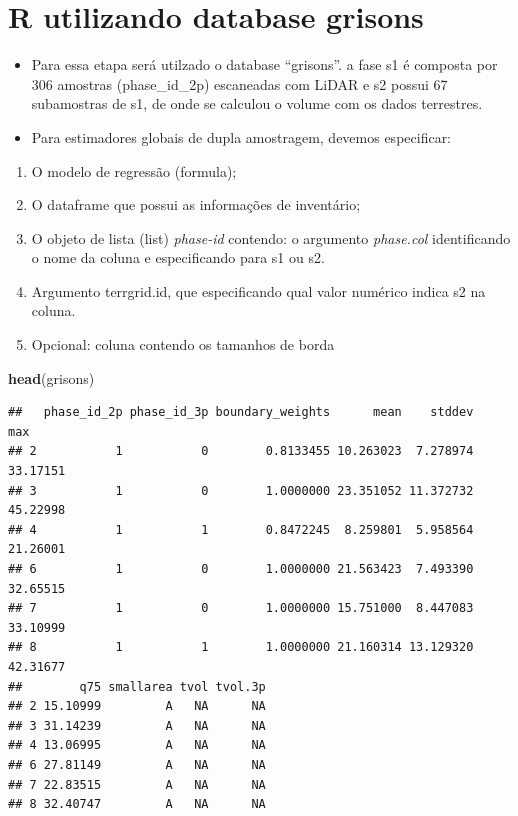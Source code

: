 \documentclass[
]{article}
\newenvironment{Shaded}{\begin{snugshade}}{\end{snugshade}}
\newcommand{\FunctionTok}[1]{\textcolor[rgb]{0.13,0.29,0.53}{\textbf{#1}}}
\newcommand{\NormalTok}[1]{#1}
\providecommand{\tightlist}{%
  \setlength{\itemsep}{0pt}\setlength{\parskip}{0pt}}
\begin{document}
\section{R utilizando database
grisons}\label{r-utilizando-database-grisons}

\begin{itemize}
\tightlist
\item
  Para essa etapa será utilzado o database ``grisons''. a fase s1 é
  composta por 306 amostras (phase\_id\_2p) escaneadas com LiDAR e s2
  possui 67 subamostras de s1, de onde se calculou o volume com os dados
  terrestres.
\item
  Para estimadores globais de dupla amostragem, devemos especificar:\\
\end{itemize}

\begin{enumerate}
\def\labelenumi{\arabic{enumi}.}
\tightlist
\item
  O modelo de regressão (formula);
\item
  O dataframe que possui as informações de inventário;
\item
  O objeto de lista (list) \emph{phase-id} contendo: o argumento
  \emph{phase.col} identificando o nome da coluna e especificando para
  s1 ou s2.
\item
  Argumento terrgrid.id, que especificando qual valor numérico indica s2
  na coluna.
\item
  Opcional: coluna contendo os tamanhos de borda
\end{enumerate}

\begin{Shaded}
\begin{Highlighting}[]
\FunctionTok{head}\NormalTok{(grisons)}
\end{Highlighting}
\end{Shaded}

\begin{verbatim}
##   phase_id_2p phase_id_3p boundary_weights      mean    stddev      max
## 2           1           0        0.8133455 10.263023  7.278974 33.17151
## 3           1           0        1.0000000 23.351052 11.372732 45.22998
## 4           1           1        0.8472245  8.259801  5.958564 21.26001
## 6           1           0        1.0000000 21.563423  7.493390 32.65515
## 7           1           0        1.0000000 15.751000  8.447083 33.10999
## 8           1           1        1.0000000 21.160314 13.129320 42.31677
##        q75 smallarea tvol tvol.3p
## 2 15.10999         A   NA      NA
## 3 31.14239         A   NA      NA
## 4 13.06995         A   NA      NA
## 6 27.81149         A   NA      NA
## 7 22.83515         A   NA      NA
## 8 32.40747         A   NA      NA
\end{verbatim}
\end{document}
